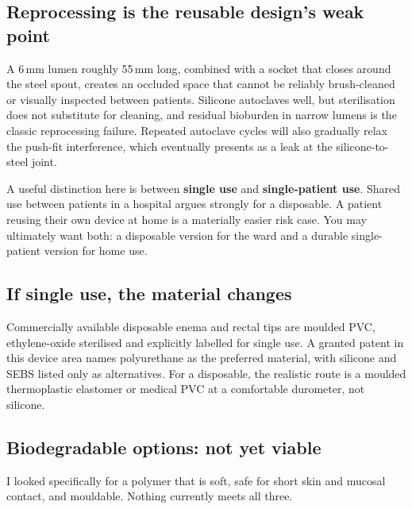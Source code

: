 \documentclass[11pt]{article}
\begin{document}
\subsection*{Reprocessing is the reusable design's weak point}

A 6\,mm lumen roughly 55\,mm long, combined with a socket that closes around the steel spout, creates an occluded space that cannot be reliably brush-cleaned or visually inspected between patients. Silicone autoclaves well, but sterilisation does not substitute for cleaning, and residual bioburden in narrow lumens is the classic reprocessing failure. Repeated autoclave cycles will also gradually relax the push-fit interference, which eventually presents as a leak at the silicone-to-steel joint.

A useful distinction here is between \textbf{single use} and \textbf{single-patient use}. Shared use between patients in a hospital argues strongly for a disposable. A patient reusing their own device at home is a materially easier risk case. You may ultimately want both: a disposable version for the ward and a durable single-patient version for home use.

\subsection*{If single use, the material changes}

Commercially available disposable enema and rectal tips are moulded PVC, ethylene-oxide sterilised and explicitly labelled for single use. A granted patent in this device area names polyurethane as the preferred material, with silicone and SEBS listed only as alternatives. For a disposable, the realistic route is a moulded thermoplastic elastomer or medical PVC at a comfortable durometer, not silicone.

\subsection*{Biodegradable options: not yet viable}

I looked specifically for a polymer that is soft, safe for short skin and mucosal contact, and mouldable. Nothing currently meets all three.
\end{document}
